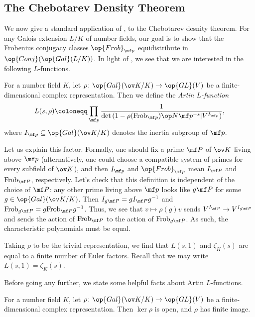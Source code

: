 \documentclass[../thesis.tex]{subfiles}
\begin{document}
\subsection{The Chebotarev Density Theorem}
We now give a standard application of , to the Chebotarev desnity theorem. For any Galois extension $L/K$ of number fields, our goal is to show that the Frobenius conjugacy classes $\op{Frob}_{\mf p}$ equidistribute in $\op{Conj}(\op{Gal}(L/K))$. In light of , we see that we are interested in the following $L$-functions.
\begin{defihelper} 
	For a number field $K$, let $\rho\colon\op{Gal}(\ov K/K)\to\op{GL}(V)$ be a finite-dimen\-sional complex representation. Then we define the \textit{Artin $L$-function}
	\[L(s,\rho)\coloneqq\prod_{\mf p}\frac1{\det\left(1-\rho(\mathrm{Frob}_{\mf p})\op N\mf p^{-s}\vert V^{I_{\mf p}}\right)},\]
	where $I_{\mf p}\subseteq\op{Gal}(\ov K/K)$ denotes the inertia subgroup of $\mf p$.
\end{defihelper}
\begin{remark}
	Let us explain this factor. Formally, one should fix a prime $\mf P$ of $\ov K$ living above $\mf p$ (alternatively, one could choose a compatible system of primes for every subfield of $\ov K$), and then $I_{\mf p}$ and $\op{Frob}_{\mf p}$ mean $I_{\mf P}$ and $\mathrm{Frob}_{\mf P}$, respectively. Let's check that this definition is independent of the choice of $\mf P$: any other prime living above $\mf p$ looks like $g\mf P$ for some $g\in\op{Gal}(\ov K/K)$. Then $I_{g\mf P}=gI_{\mf P}g^{-1}$ and $\mathrm{Frob}_{g\mf P}=g\mathrm{Frob}_{\mf P}g^{-1}$. Thus, we see that $v\mapsto\rho(g)v$ sends $V^{I_{\mf P}}\to V^{I_{g\mf P}}$ and sends the action of $\mathrm{Frob}_{\mf P}$ to the action of $\mathrm{Frob}_{g\mf P}$. As such, the characteristic polynomials must be equal.
\end{remark}
\begin{example} \label{ex:artin-gives-dedekind}
	Taking $\rho$ to be the trivial representation, we find that $L(s,1)$ and $\zeta_K(s)$ are equal to a finite number of Euler factors. Recall that we may write $L(s,1)=\zeta_K(s)$.
\end{example}
Before going any further, we state some helpful facts about Artin $L$-functions.
\begin{lemma} \label{lem:artin-finite-image}
	For a number field $K$, let $\rho\colon\op{Gal}(\ov K/K)\to\op{GL}(V)$ be a finite-dimensional complex representation. Then $\ker\rho$ is open, and $\rho$ has finite image.
\end{lemma}
\end{document}
